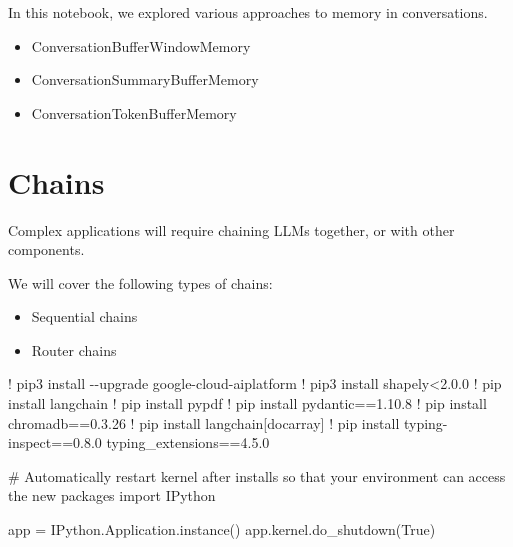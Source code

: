 \documentclass[
  letterpaper,
  DIV=11,
  numbers=noendperiod]{scrreprt}
\newenvironment{Shaded}{\begin{snugshade}}{\end{snugshade}}
\newcommand{\CommentTok}[1]{\textcolor[rgb]{0.37,0.37,0.37}{#1}}
\newcommand{\FloatTok}[1]{\textcolor[rgb]{0.68,0.00,0.00}{#1}}
\newcommand{\ImportTok}[1]{\textcolor[rgb]{0.00,0.46,0.62}{#1}}
\newcommand{\NormalTok}[1]{\textcolor[rgb]{0.00,0.23,0.31}{#1}}
\newcommand{\OperatorTok}[1]{\textcolor[rgb]{0.37,0.37,0.37}{#1}}
\newcommand{\VariableTok}[1]{\textcolor[rgb]{0.07,0.07,0.07}{#1}}
\begin{document}
In this notebook, we explored various approaches to memory in
conversations.

\begin{itemize}
\item
  ConversationBufferWindowMemory
\item
  ConversationSummaryBufferMemory
\item
  ConversationTokenBufferMemory
\end{itemize}

\hypertarget{chains}{%
\chapter{Chains}\label{chains}}

Complex applications will require chaining LLMs together, or with other
components.

We will cover the following types of chains:

\begin{itemize}
\item
  Sequential chains
\item
  Router chains
\end{itemize}

\begin{Shaded}
\begin{Highlighting}[]
\OperatorTok{!}\NormalTok{ pip3 install }\OperatorTok{{-}{-}}\NormalTok{upgrade google}\OperatorTok{{-}}\NormalTok{cloud}\OperatorTok{{-}}\NormalTok{aiplatform}
\OperatorTok{!}\NormalTok{ pip3 install shapely}\OperatorTok{\textless{}}\FloatTok{2.0.0}
\OperatorTok{!}\NormalTok{ pip install langchain}
\OperatorTok{!}\NormalTok{ pip install pypdf}
\OperatorTok{!}\NormalTok{ pip install pydantic}\OperatorTok{==}\FloatTok{1.10.8}
\OperatorTok{!}\NormalTok{ pip install chromadb}\OperatorTok{==}\FloatTok{0.3.26}
\OperatorTok{!}\NormalTok{ pip install langchain[docarray]}
\OperatorTok{!}\NormalTok{ pip install typing}\OperatorTok{{-}}\NormalTok{inspect}\OperatorTok{==}\FloatTok{0.8.0}\NormalTok{ typing\_extensions}\OperatorTok{==}\FloatTok{4.5.0}
\end{Highlighting}
\end{Shaded}

\begin{Shaded}
\begin{Highlighting}[]
\CommentTok{\# Automatically restart kernel after installs so that your environment can access the new packages}
\ImportTok{import}\NormalTok{ IPython}

\NormalTok{app }\OperatorTok{=}\NormalTok{ IPython.Application.instance()}
\NormalTok{app.kernel.do\_shutdown(}\VariableTok{True}\NormalTok{)}
\end{Highlighting}
\end{Shaded}
\end{document}
